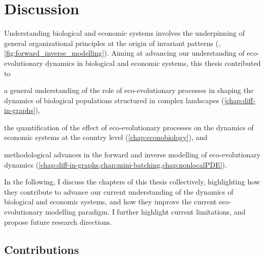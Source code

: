 
\graphicspath{{./content/conclusion/fig/}}

\chapter{Discussion}
\label{sec:conclusion}



Understanding biological and economic systems involves the underpinning of general organizational principles at the origin of invariant patterns (\cite{Levin2002}, \cref{fig:forward_inverse_modelling}).
% 
Aiming at advancing our understanding of eco-evolutionary dynamics in biological and economic systems, this thesis contributed to
% 
\begin{mylisti}
    \item a general understanding of the role of eco-evolutionary processes in shaping the dynamics of biological populations structured in complex landscapes (\cref{chap:diff-in-graphs}),
    \item the quantification of the effect of eco-evolutionary processes on the dynamics of economic systems at the country level (\cref{chap:econobiology}), and
    \item methodological advances in the forward and inverse modelling of eco-evolutionary dynamics (\cref{chap:diff-in-graphs,chap:mini-batching,chap:nonlocalPDE}).
\end{mylisti}
% 
In the following, I discuss the chapters of this thesis collectively, highlighting how they contribute to advance our current understanding of the dynamics of biological and economic systems, and how they improve the current eco-evolutionary modelling paradigm. I further highlight current limitations, and propose future research directions.

\section{Contributions}


